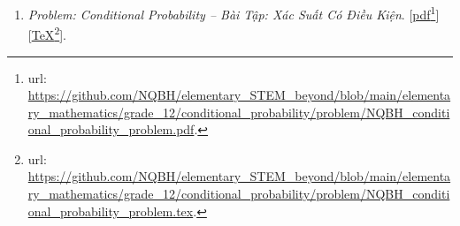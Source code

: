 \documentclass[12pt,twoside]{book}
\begin{document}
\begin{enumerate}
	Folder: {\sf Elementary STEM \& Beyond{\tt/}Elementary Mathematics{\tt/}grade 12{\tt/}plane, line, sphere equations{\tt/}problem}.
	\begin{itemize}
		\item {\it Problem \& Solution: Equations of Plane, Line, {\it\&} Sphere in 3D Space -- Bài Tập \& Lời Giải: Phương Trình Mặt Phẳng, Đường Thẳng, Mặt Cầu Trong Không Gian}. [\href{https://github.com/NQBH/elementary_STEM_beyond/blob/main/elementary_mathematics/grade_12/3D_plane_line_sphere_equation/solution/NQBH_3D_plane_line_sphere_equation_solution.pdf}{pdf}\footnote{{\sc url}: \url{https://github.com/NQBH/elementary_STEM_beyond/blob/main/elementary_mathematics/grade_12/3D_plane_line_sphere_equation/solution/NQBH_3D_plane_line_sphere_equation_solution.pdf}.}][\href{https://github.com/NQBH/elementary_STEM_beyond/blob/main/elementary_mathematics/grade_12/3D_plane_line_sphere_equation/solution/NQBH_3D_plane_line_sphere_equation_solution.tex}{\TeX}\footnote{{\sc url}: \url{https://github.com/NQBH/elementary_STEM_beyond/blob/main/elementary_mathematics/grade_12/3D_plane_line_sphere_equation/solution/NQBH_3D_plane_line_sphere_equation_solution.tex}.}].
		
		Folder: {\sf Elementary STEM \& Beyond{\tt/}Elementary Mathematics{\tt/}grade 12{\tt/}plane, line, sphere equations{\tt/}solution}.
	\end{itemize}
	\item {\it Problem: Conditional Probability -- Bài Tập: Xác Suất Có Điều Kiện}. [\href{https://github.com/NQBH/elementary_STEM_beyond/blob/main/elementary_mathematics/grade_12/conditional_probability/problem/NQBH_conditional_probability_problem.pdf}{pdf}\footnote{{\sc url}: \url{https://github.com/NQBH/elementary_STEM_beyond/blob/main/elementary_mathematics/grade_12/conditional_probability/problem/NQBH_conditional_probability_problem.pdf}.}][\href{https://github.com/NQBH/elementary_STEM_beyond/blob/main/elementary_mathematics/grade_12/conditional_probability/problem/NQBH_conditional_probability_problem.tex}{\TeX}\footnote{{\sc url}: \url{https://github.com/NQBH/elementary_STEM_beyond/blob/main/elementary_mathematics/grade_12/conditional_probability/problem/NQBH_conditional_probability_problem.tex}.}].
	

\end{enumerate}
\end{document}
